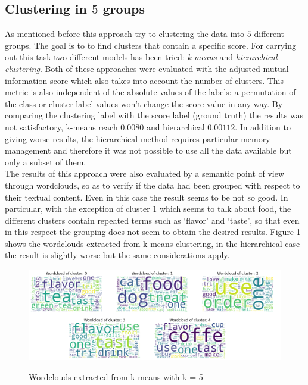 \documentclass[11pt]{article}
\begin{document}
\subsection{Clustering in $5$ groups}
As mentioned before this approach try to clustering the data into $5$ different groups. The goal is to to find clusters that contain a specific score. For carrying out this task two different models has been tried: \textit{k-means} and \textit{hierarchical clustering}. Both of these approaches were evaluated with the adjusted mutual information score which also takes into account the number of clusters. This metric is also independent of the absolute values of the labels: a permutation of the class or cluster label values won’t change the score value in any way. By comparing the clustering label with the score label (ground truth) the results was not satisfactory, k-means reach $0.0080$ and hierarchical $0.00112$. In addition to giving worse results, the hierarchical method requires particular memory management and therefore it was not possible to use all the data available but only a subset of them.\\
The results of this approach were also evaluated by a semantic point of view through wordclouds, so as to verify if the data had been grouped with respect to their textual content. Even in this case the result seems to be not so good. In particular, with the exception of cluster $1$ which seems to talk about food, the different clusters contain repeated terms such as `flavor' and `taste', so that even in this respect the grouping does not seem to obtain the desired results. Figure \ref{cluster_5_fig} shows the wordclouds extracted from k-means clustering, in the hierarchical case the result is slightly worse but the same considerations apply. 
\begin{figure}[H]
\begin{center}
  \includegraphics[scale = 0.5]{img/cluster_5.png}\\
  \caption{Wordclouds extracted from k-means with k = 5}
  \label{cluster_5_fig}
\end{center}
\end{figure}
\end{document}
